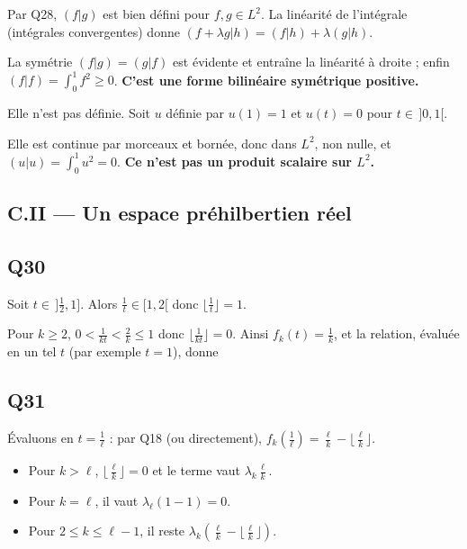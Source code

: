 \documentclass[11pt,a4paper]{article}
\providecommand{\tightlist}{\setlength{\itemsep}{0pt}\setlength{\parskip}{0pt}}
\newcommand{\equationajustee}[1]{%
  \sbox{\boiteequation}{$\displaystyle #1$}%
  \ifdim\wd\boiteequation>\linewidth
    \[\resizebox{\linewidth}{!}{\usebox{\boiteequation}}\]%
  \else
    \[#1\]%
  \fi}
\begin{document}
Par Q28, \((f|g)\) est bien défini pour \(f,g\in L^2\). La linéarité de l'intégrale (intégrales convergentes) donne \((f+\lambda g|h)=(f|h)+\lambda(g|h)\).

La symétrie \((f|g)=(g|f)\) est évidente et entraîne la linéarité à droite ; enfin \((f|f)=\int_0^1f^2\geqslant0\). \textbf{C'est une forme bilinéaire symétrique positive.}

Elle n'est pas définie. Soit \(u\) définie par \(u(1)=1\) et \(u(t)=0\) pour \(t\in\,]0,1[\).

Elle est continue par morceaux et bornée, donc dans \(L^2\), non nulle, et \((u|u)=\int_0^1u^2=0\). \textbf{Ce n'est pas un produit scalaire sur \(L^2\).}

\hypertarget{c.ii-un-espace-pruxe9hilbertien-ruxe9el}{%
\subsection{C.II --- Un espace préhilbertien réel}\label{c.ii-un-espace-pruxe9hilbertien-ruxe9el}}

\hypertarget{q30}{%
\subsection{Q30}\label{q30}}

Soit \(t\in\,]\frac12,1]\). Alors \(\frac1t\in[1,2[\) donc \(\lfloor\frac1t\rfloor=1\).

Pour \(k\geqslant2\), \(0<\frac1{kt}<\frac2k\leqslant1\) donc \(\lfloor\frac1{kt}\rfloor=0\). Ainsi \(f_k(t)=\frac1k\), et la relation, évaluée en un tel \(t\) (par exemple \(t=1\)), donne
\equationajustee{\boxed{\sum_{k=2}^n\frac{\lambda_k}{k}=0.}}

\hypertarget{q31}{%
\subsection{Q31}\label{q31}}

Évaluons en \(t=\frac1\ell\) : par Q18 (ou directement), \(f_k(\frac1\ell)=\frac\ell k-\lfloor\frac\ell k\rfloor\).

\begin{itemize}
\tightlist
\item
  Pour \(k>\ell\), \(\lfloor\frac\ell k\rfloor=0\) et le terme vaut \(\lambda_k\frac\ell k\).
\item
  Pour \(k=\ell\), il vaut \(\lambda_\ell(1-1)=0\).
\item
  Pour \(2\leqslant k\leqslant\ell-1\), il reste \(\lambda_k(\frac\ell k-\lfloor\frac\ell k\rfloor)\).
\end{itemize}
\end{document}
